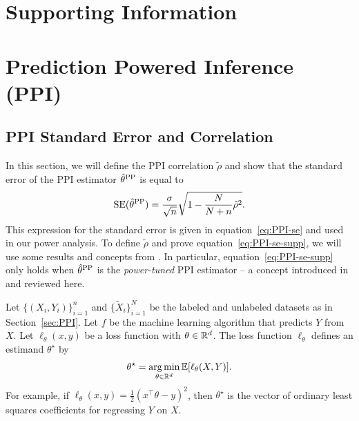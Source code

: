 

\captionsetup[figure]{labelformat=simple, labelsep=colon}
\captionsetup[table]{labelformat=simple, labelsep=colon}
\renewcommand{\thefigure}{S\arabic{figure}}
\renewcommand{\thetable}{S\arabic{table}}

\setcounter{figure}{0}
\setcounter{table}{0}

\onehalfspacing
{}
\setcounter{1}

\section*{\LARGE Supporting Information}



\section{Prediction Powered Inference (PPI)}\label{sec:power}

\subsection{PPI Standard Error and Correlation}\label{sec:ppi-se-and-corr}

In this section, we will define the PPI correlation $\tilde{\rho}$ and show that the standard error of the PPI estimator $\hat{\theta}^{\mathrm{PP}}$ is equal to 
\begin{equation}\label{eq:PPI-se-supp}
    \mathrm{SE}(\hat{\theta}^{\mathrm{PP}}) = \frac{\sigma}{\sqrt{n}}\sqrt{1-\frac{N}{N+n}\tilde{\rho}^2}.
\end{equation}
This expression for the standard error is given in equation~\eqref{eq:PPI-se} and used in our power analysis. To define $\tilde{\rho}$ and prove equation~\eqref{eq:PPI-se-supp}, we will use some results and concepts from \cite{angelopoulos2024ppi}. In particular, equation~\eqref{eq:PPI-se-supp} only holds when $\hat{\theta}^{\mathrm{PP}}$ is the \emph{power-tuned} PPI estimator -- a concept introduced in \cite[Section 6]{angelopoulos2024ppi} and reviewed here.

Let $\{(X_i,Y_i)\}_{i=1}^n$ and $\{\widetilde{X}_i\}_{i=1}^N$ be the labeled and unlabeled datasets as in Section~\ref{sec:PPI}. Let $f$ be the machine learning algorithm that predicts $Y$ from $X$. Let $\ell_\theta(x,y)$ be a loss function with $\theta \in \mathbb{R}^d$. The loss function $\ell_\theta$ defines an estimand $\theta^\star$ by
\[\theta^\star = \operatorname*{arg\,min}_{\theta \in \mathbb{R}^d} \mathbb{E}[\ell_\theta(X,Y)]. \]
For example, if $\ell_\theta(x,y) = \frac{1}{2}(x^\top \theta - y)^2$, then $\theta^\star$ is the vector of ordinary least squares coefficients for regressing $Y$ on $X$. 

